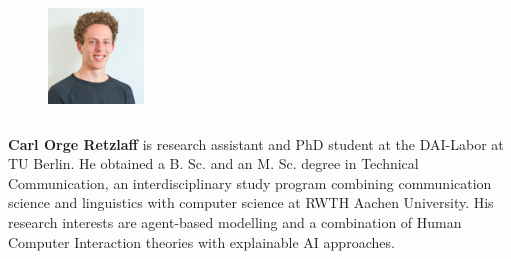 





 \begin{figure} 
    \includegraphics[width=1in,height=1.25in,clip,keepaspectratio]{bio-images/retzlaff.jpg}
  \end{figure}\par
  \textbf{Carl Orge Retzlaff} is research assistant and PhD student at the DAI-Labor at TU Berlin. He obtained a B. Sc. and an M. Sc. degree in Technical Communication, an interdisciplinary study program combining communication science and linguistics with computer science at RWTH Aachen University. His research interests are agent-based modelling and a combination of Human Computer Interaction theories with explainable AI approaches.\par

